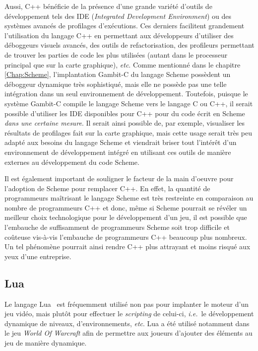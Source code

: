 \documentclass[12pt,twoside,letterpaper,francais]{book}
\newcommand{\ie}{{\textit{i.e.}~}}
\begin{document}
Aussi, C++ bénéficie de la présence d'une grande variété d'outils de
développement tels des IDE (\textit{Integrated Development
  Environment}) ou des systèmes avancés de profilages
d'exécutions. Ces derniers facilitent grandement l'utilisation du
langage C++ en permettant aux développeurs d'utiliser des déboggeurs
visuels avancés, des outils de refactorisation, des profileurs
permettant de trouver les parties de code les plus utilisées (autant
dans le processeur principal que sur la carte graphique),
\textit{etc}. Comme mentionné dans le chapitre \ref{Chap:Scheme},
l'implantation Gambit-C du langage Scheme possèdent un déboggeur
dynamique très sophistiqué, mais elle ne possède pas une telle
intégration dans un seul environnement de développement. Toutefois,
puisque le système Gambit-C compile le langage Scheme vers le langage
C ou C++, il serait possible d'utiliser les IDE disponibles pour C++
pour du code écrit en Scheme \textit{dans une certaine mesure}. Il
serait ainsi possible de, par exemple, visualiser les résultats de
profilages fait sur la carte graphique, mais cette usage serait très
peu adapté aux besoins du langage Scheme et viendrait briser tout
l'intérêt d'un environnement de développement intégré en utilisant ces
outils de manière externes au développement du code Scheme.

Il est également important de souligner le facteur de la main d'oeuvre
pour l'adoption de Scheme pour remplacer C++. En effet, la quantité de
programmeurs maîtrisant le langage Scheme est très restreinte en
comparaison au nombre de programmeurs C++ et donc, même si Scheme
pourrait se révéler un meilleur choix technologique pour le
dévelop\-pement d'un jeu, il est possible que l'embauche de
suffisamment de programmeurs Scheme soit trop difficile et coûteuse
vis-à-vis l'embauche de programmeurs C++ beaucoup plus nombreux. Un
tel phénomène pourrait ainsi rendre C++ plus attrayant et moins risqué
aux yeux d'une entreprise.


\FloatBarrier
\subsection{Lua}
Le langage Lua~\cite{Lua} est fréquemment utilisé non pas pour
implanter le moteur d'un jeu vidéo, mais plutôt pour effectuer le
\textit{scripting} de celui-ci, \ie le dévelop\-pement dynamique de
niveaux, d'environnements, \textit{etc}. Lua a été utilisé notamment
dans le jeu \textit{World Of Warcraft} afin de permettre aux joueurs
d'ajouter des éléments au jeu de manière dynamique.
\end{document}
